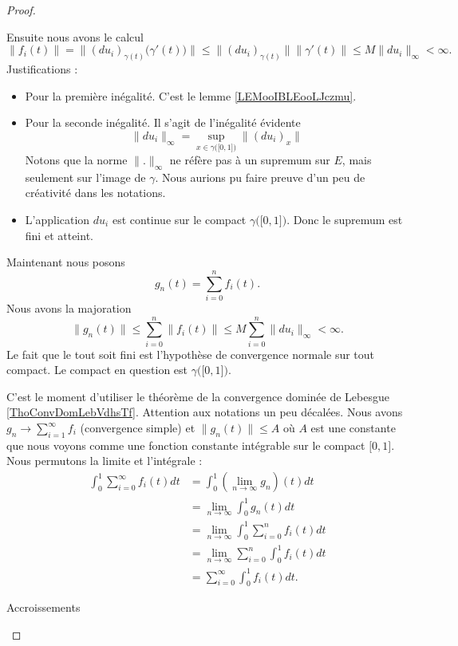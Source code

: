 \begin{proof}
\begin{subproof}
		Ensuite nous avons le calcul
		\begin{equation}
			\| f_i(t) \|=\| (du_i)_{\gamma(t)}\big( \gamma'(t) \big) \|
			\leq\| (du_i)_{\gamma(t)} \|\| \gamma'(t) \|
			\leq M\| du_i \|_{\infty}<\infty.
		\end{equation}
		Justifications :
		\begin{itemize}
			\item
			      Pour la première inégalité. C'est le lemme \ref{LEMooIBLEooLJczmu}.
			\item Pour la seconde inégalité. Il s'agit de l'inégalité évidente
			      \begin{equation}
				      \| du_i \|_{\infty}=\sup_{x\in \gamma\big( \mathopen[ 0 , 1 \mathclose] \big)}\| (du_i)_x \|
			      \end{equation}
			      Notons que la norme \( \| . \|_{\infty}\) ne réfère pas à un supremum sur \( E\), mais seulement sur l'image de \( \gamma\). Nous aurions pu faire preuve d'un peu de créativité dans les notations.
			\item
			      L'application \( du_i\) est continue sur le compact \( \gamma\big( \mathopen[ 0 , 1 \mathclose] \big)\). Donc le supremum est fini et atteint.
		\end{itemize}

		Maintenant nous posons
		\begin{equation}
			g_n(t)=\sum_{i=0}^nf_i(t).
		\end{equation}
		Nous avons la majoration
		\begin{equation}
			\| g_n(t) \|\leq \sum_{i=0}^n\| f_i(t) \|\leq M\sum_{i=0}^n\| du_i \|_{\infty}<\infty.
		\end{equation}
		Le fait que le tout soit fini est l'hypothèse de convergence normale sur tout compact. Le compact en question est \( \gamma\big( \mathopen[ 0 , 1 \mathclose] \big)\).

		C'est le moment d'utiliser le théorème de la convergence dominée de Lebesgue \ref{ThoConvDomLebVdhsTf}. Attention aux notations un peu décalées. Nous avons \( g_n\to \sum_{i=1}^{\infty}f_i\) (convergence simple) et \( \| g_n(t) \|\leq A\) où \( A\) est une constante que nous voyons comme une fonction constante intégrable sur le compact \( \mathopen[ 0 , 1 \mathclose]\). Nous permutons la limite et l'intégrale :
		\begin{subequations}
			\begin{align}
				\int_0^1\sum_{i=0}^{\infty}f_i(t)dt & =\int_0^1(\lim_{n\to \infty} g_n)(t)dt             \\
				                                    & =\lim_{n\to \infty} \int_0^1g_n(t)dt               \\
				                                    & =\lim_{n\to \infty} \int_{0}^1\sum_{i=0}^nf_i(t)dt \\
				                                    & =\lim_{n\to \infty} \sum_{i=0}^n\int_0^1f_i(t)dt   \\
				                                    & =\sum_{i=0}^{\infty}\int_0^1f_i(t)dt.
			\end{align}
		\end{subequations}
		\item[Accroissements]


\end{subproof}
\end{proof}
